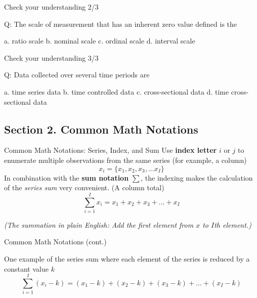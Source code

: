 \documentclass{beamer}
\begin{document}
\begin{frame}{Check your understanding 2/3}

Q: The scale of measurement that has an inherent zero value defined is the

\vspace{5 pt}

a.	ratio scale \linebreak
b.	nominal scale \linebreak
c.	ordinal scale \linebreak
d.	interval scale

\end{frame}

\begin{frame}{Check your understanding 3/3}

Q: Data collected over several time periods are

\vspace{5 pt}

a.	time series data \linebreak
b.	time controlled data \linebreak
c.	cross-sectional data \linebreak
d.	time cross-sectional data

\end{frame}



\subsection{Section 2. Common Math Notations}

\begin{frame}{Common Math Notations: Series, Index, and Sum}
Use \textbf{index letter} $i$ or $j$ to enumerate multiple observations from the same series (for example, a column)
$$ x_i = \lbrace x_1, x_2, x_3, ... x_I\rbrace $$
In combination with the \textbf{sum notation} $\sum$, the indexing makes the calculation of the \textit{series sum} very convenient. (A column total)
$$ \sum_{i=1}^{I}x_i = x_1 + x_2 + x_3 + ... + x_{I}$$

\begin{small}
\textit{(The summation in plain English: Add the first element from $x$ to $I$th element.)} 
\end{small}




\end{frame}


\begin{frame}{Common Math Notations (cont.)}

One example of the series sum where each element of the series is reduced by a constant value $k$
$$ \sum_{i=1}^{I}(x_i - k) = (x_1 - k) + (x_2 - k) + (x_3 - k) + ... + (x_I - k)$$


\end{frame}
\end{document}
